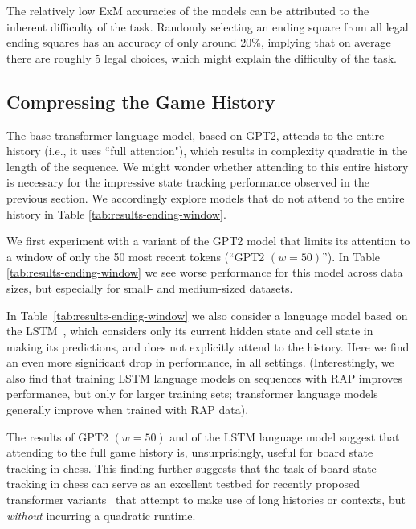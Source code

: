 The relatively low ExM accuracies of the models can be attributed to the inherent difficulty of the task.   
Randomly selecting an ending square from all legal ending squares 
has an accuracy of only around 20\%, implying that on average there are roughly 5 legal choices, which might explain the difficulty of the task.  



\subsection{Compressing the Game History}
\label{sec:other_models}
The base transformer language model, based on GPT2, attends to the entire history (i.e., it uses ``full attention"), which results in complexity quadratic in the length of the sequence. We might wonder whether attending to this entire history is necessary for the impressive state tracking performance observed in the %
previous section.
We accordingly 
explore models that do not attend to the entire history in Table \ref{tab:results-ending-window}. %

We first experiment with a variant of the GPT2 model that limits its attention to a window of only the 50 most recent tokens (``GPT2 $(w=50)$''). In Table \ref{tab:results-ending-window} we see worse performance for this model across data sizes, but especially for small- and medium-sized datasets. 

In Table~\ref{tab:results-ending-window} we also consider a language model based on the LSTM~\citep{hochreiter1997long}, which considers only its current hidden state and cell state in making its predictions, and does not explicitly attend to the history. %
Here we find an even more significant drop in performance, in all settings. (Interestingly, we also find that training LSTM language models on sequences with RAP improves performance, but only for larger training sets; transformer language models generally improve when trained with RAP data). 

The results of GPT2 $(w = 50)$ and of the LSTM language model suggest that attending to the full game history is, unsurprisingly, useful for board state tracking in chess. This finding further suggests that the task of board state tracking in chess can serve as an excellent testbed for recently proposed transformer variants~\citep[\textit{inter alia}]{kitaev2020reformer,katharopoulos20,choromanski2021rethinking} that attempt to make use of long histories or contexts, but \textit{without} incurring a quadratic runtime. 



